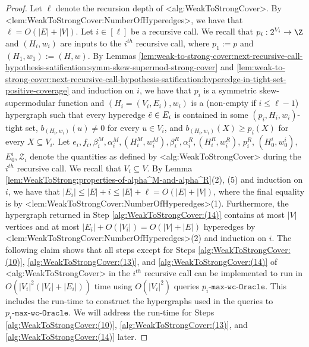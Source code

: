 \documentclass{article}
\def\Cref#1{<#1>}%
\newcommand{\zeros}{\ensuremath{\mathcal{Z}}\xspace}
\newcommand{\functionMaximizationOracle}[1]{\ensuremath{{#1}\text{-}\mathtt{max}\text{-}\mathtt{wc}\text{-}\mathtt{Oracle}}\xspace}
\begin{document}
\begin{proof}
Let $\ell$ denote the recursion depth of \Cref{alg:WeakToStrongCover}. By \Cref{lem:WeakToStrongCover:NumberOfHyperedges}, we have that $\ell=O(|E|+|V|)$. 
Let  $i \in [\ell]$ be a recursive call.
 We recall that $p_i:2^{V_i}\rightarrow\Z$ and $(H_i, w_i)$ are inputs to the $i^{th}$ recursive call, where $p_1 := p$ and $(H_1, w_1) := (H, w)$.
By Lemmas \ref{lem:weak-to-strong-cover:next-recursive-call-hypothesis-satification:symm-skew-supermod-strong-cover} and \ref{lem:weak-to-strong-cover:next-recursive-call-hypothesis-satification:hyperedge-in-tight-set-positive-coverage} and induction on $i$, we have that $p_i$ is a symmetric skew-supermodular function and $(H_i = (V_i, E_i), w_i)$ is a (non-empty if $i \leq \ell - 1$) hypergraph such that every hyperedge $\Tilde{e} \in E_i$ is contained in some $(p_i, H_i, w_i)$-tight set, $b_{(H_i, w_i)}(u) \not = 0$ for every $u \in V_i$, and $b_{(H_i, w_i)}(X) \geq p_i(X)$ for every $X \subseteq V_i$. Let $e_i, f_i, \beta_i^M, \alpha_i^M, (H_i^M, w_i^M), \beta_i^R, \alpha_i^R, (H_i^R, w_i^R)$, $p_i^R$, $(H_0^{i}, w_0^{i})$, $E_0^i, \zeros_i$ denote the quantities  as defined by \Cref{alg:WeakToStrongCover} during the $i^{th}$ recursive call. We recall that $V_i \subseteq V$. By Lemma \ref{lem:WeakToStrong:properties-of-alpha^M-and-alpha^R}(2), (5) and induction on $i$, we have that $|E_i| \leq |E| + i \leq |E| + \ell = O(|E| + |V|)$, where the final equality is by \Cref{lem:WeakToStrongCover:NumberOfHyperedges}(1). 
Furthermore, the hypergraph returned in Step \ref{alg:WeakToStrongCover:(14)} contains at most $|V|$ vertices and at most $|E_i| + O(|V_i|)= O(|V| + |E|)$ hyperedges by \Cref{lem:WeakToStrongCover:NumberOfHyperedges}(2) and induction on $i$. 
The following claim shows that all steps except for Steps \ref{alg:WeakToStrongCover:(10)},  \ref{alg:WeakToStrongCover:(13)}, and  \ref{alg:WeakToStrongCover:(14)} of \Cref{alg:WeakToStrongCover} in the $i^{th}$ recursive call can be implemented to run in $O(|V_i|^2(|V_i| + |E_i|))$ time
using $O(|V_i|^2)$ queries \functionMaximizationOracle{p_i}. This includes the run-time to construct the hypergraphs used in the queries to \functionMaximizationOracle{p_i}. We will address the run-time for Steps \ref{alg:WeakToStrongCover:(10)},  \ref{alg:WeakToStrongCover:(13)}, and  \ref{alg:WeakToStrongCover:(14)} later. 


\end{proof}
\end{document}
